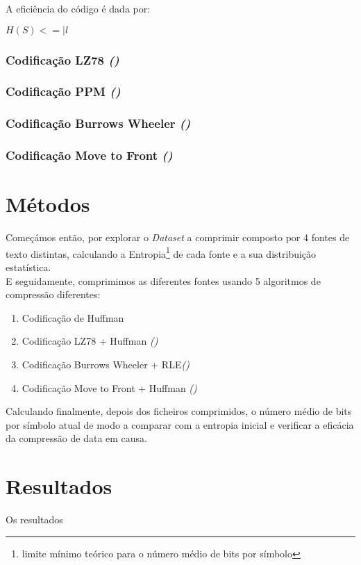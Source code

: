 \documentclass[12pt,journal,compsoc]{IEEEtran}
\begin{document}
A eficiência do código é dada por:

\begin{math}H(S)<=|l\end{math}



\subsubsection{Codificação LZ78 \textit{()}}
\subsubsection{Codificação PPM \textit{()}}
\subsubsection{Codificação Burrows Wheeler \textit{()}}
\subsubsection{Codificação Move to Front \textit{()}}


\section{Métodos}\label{sec:metodos}
Começámos então, por explorar o \textit{Dataset} a comprimir composto por 4 fontes de texto distintas, calculando a Entropia\footnote{limite mínimo teórico para o número médio de bits por símbolo} de cada fonte e a sua distribuição estatística.\\
E seguidamente, comprimimos as diferentes fontes usando 5 algoritmos de compressão diferentes:

\begin{enumerate}
    \item Codificação de Huffman
    \item Codificação LZ78 + Huffman \textit{()}
    \item Codificação Burrows Wheeler + RLE\textit{()}
    \item Codificação Move to Front + Huffman \textit{()}
\end{enumerate}


Calculando finalmente, depois dos ficheiros comprimidos, o número médio de bits por símbolo atual de modo a comparar com a entropia inicial e verificar a eficácia da compressão de data em causa.

\section{Resultados} %
Os resultados 
\end{document}
